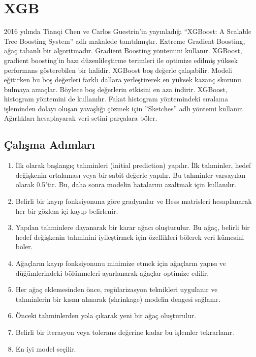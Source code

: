 \section{XGB}

2016 yılında Tianqi Chen ve Carlos Guestrin'in yayınladığı ``XGBoost: A Scalable Tree Boosting System'' adlı makalede tanıtılmıştır. Extreme Gradient Boosting, ağaç tabanlı bir algoritmadır. Gradient Boosting yöntemini kullanır. XGBoost, gradient boosting'in bazı düzenlileştirme terimleri ile optimize edilmiş yüksek performans gösterebilen bir halidir. XGBoost boş değerle çalışabilir. Modeli eğitirken bu boş değerleri farklı dallara yerleştirerek en yüksek kazanç skorunu bulmaya amaçlar. Böylece boş değerlerin etkisini en aza indirir. XGBoost, histogram yöntemini de kullanılır. Fakat histogram yöntemindeki sıralama işleminden dolayı oluşan yavaşlığı çözmek için ''Sketches'' adlı yöntemi kullanır. Ağırlıkları hesaplayarak veri setini parçalara böler.

\subsection{Çalışma Adımları}
\begin{enumerate}
	\item İlk olarak başlangıç tahminleri (initial prediction) yapılır. İlk tahminler, hedef değişkenin ortalaması veya bir sabit değerle yapılır. 	Bu tahminler varsayılan olarak 0.5'tir.  Bu, daha sonra modelin hatalarını azaltmak için kullanılır.
	\item Belirli bir kayıp fonksiyonuna göre gradyanlar ve Hess matrisleri hesaplanarak her bir gözlem içi kayıp belirlenir.
	\item Yapılan tahminlere dayanarak bir karar ağacı oluşturulur. Bu ağaç, belirli bir hedef değişkenin tahminini iyileştirmek için özellikleri bölerek veri kümesini böler.
	\item Ağaçların kayıp fonksiyonunu minimize etmek için ağaçların yapısı ve düğümlerindeki bölünmeleri ayarlanarak ağaçlar optimize edilir.
	\item Her ağaç eklemesinden önce, regülarizasyon teknikleri uygulanır ve tahminlerin bir kısmı alınarak (shrinkage) modelin dengesi sağlanır.
	\item Önceki tahminlerden yola çıkarak yeni bir ağaç oluşturulur.
	\item Belirli bir iterasyon veya tolerans değerine kadar bu işlemler tekrarlanır.
	\item En iyi model seçilir.
\end{enumerate}

